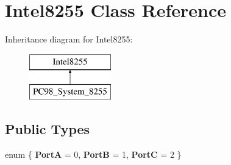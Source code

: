 \hypertarget{classIntel8255}{\section{Intel8255 Class Reference}
\label{classIntel8255}
}
Inheritance diagram for Intel8255\-:\begin{figure}[H]
\begin{center}
\leavevmode
\includegraphics[height=2.000000cm]{classIntel8255}
\end{center}
\end{figure}
\subsection*{Public Types}
\begin{DoxyCompactItemize}
\item 
enum \{ {\bfseries Port\-A} = 0, 
{\bfseries Port\-B} = 1, 
{\bfseries Port\-C} = 2
 \}
\end{DoxyCompactItemize}
